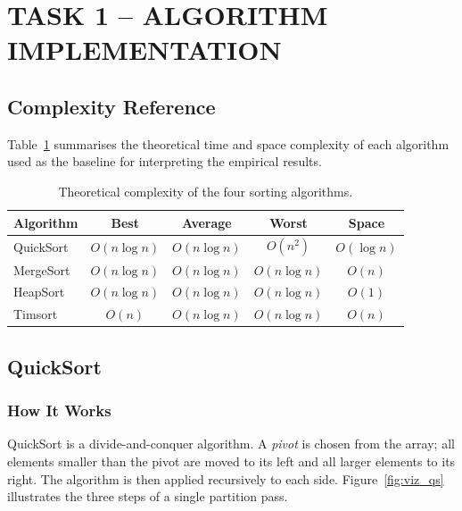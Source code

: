 \documentclass[12pt,a4paper]{article}
\begin{document}
	\section{TASK 1 -- ALGORITHM IMPLEMENTATION}
	
	\subsection{Complexity Reference}
	
	Table~\ref{tab:complexity} summarises the theoretical time and space complexity
	of each algorithm used as the baseline for interpreting the empirical results.
	
	\begin{table}[h!]
		\centering
		\caption{Theoretical complexity of the four sorting algorithms.}
		\label{tab:complexity}
		\renewcommand{\arraystretch}{1.3}
		\begin{tabular}{lcccc}
			\toprule
			\textbf{Algorithm} & \textbf{Best}   & \textbf{Average}& \textbf{Worst}  & \textbf{Space}  \\
			\midrule
			QuickSort          & $O(n\log n)$    & $O(n\log n)$    & $O(n^2)$        & $O(\log n)$     \\
			MergeSort          & $O(n\log n)$    & $O(n\log n)$    & $O(n\log n)$    & $O(n)$          \\
			HeapSort           & $O(n\log n)$    & $O(n\log n)$    & $O(n\log n)$    & $O(1)$          \\
			Timsort            & $O(n)$          & $O(n\log n)$    & $O(n\log n)$    & $O(n)$          \\
			\bottomrule
		\end{tabular}
	\end{table}
	
	\subsection{QuickSort}
	
	\subsubsection{How It Works}
	
	QuickSort is a divide-and-conquer algorithm. A \emph{pivot} is chosen from the
	array; all elements smaller than the pivot are moved to its left and all larger
	elements to its right. The algorithm is then applied recursively to each side.
	Figure~\ref{fig:viz_qs} illustrates the three steps of a single partition pass.
	
\end{document}

